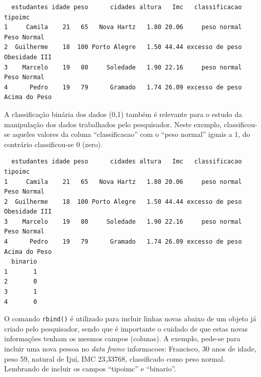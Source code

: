 \documentclass[12pt,brazil,oneside]{book}
\newenvironment{Shaded}{\begin{snugshade}}{\end{snugshade}}
\newcommand{\CommentTok}[1]{\textcolor[rgb]{0.56,0.35,0.01}{\textit{#1}}}
\newcommand{\DecValTok}[1]{\textcolor[rgb]{0.00,0.00,0.81}{#1}}
\newcommand{\KeywordTok}[1]{\textcolor[rgb]{0.13,0.29,0.53}{\textbf{#1}}}
\newcommand{\NormalTok}[1]{#1}
\newcommand{\OperatorTok}[1]{\textcolor[rgb]{0.81,0.36,0.00}{\textbf{#1}}}
\newcommand{\StringTok}[1]{\textcolor[rgb]{0.31,0.60,0.02}{#1}}
\begin{document}
\begin{verbatim}
  estudantes idade peso      cidades altura   Imc   classificacao       tipoimc
1     Camila    21   65   Nova Hartz   1.80 20.06     peso normal   Peso Normal
2  Guilherme    18  100 Porto Alegre   1.50 44.44 excesso de peso Obesidade III
3    Marcelo    19   80     Soledade   1.90 22.16     peso normal   Peso Normal
4      Pedro    19   79      Gramado   1.74 26.09 excesso de peso Acima do Peso
\end{verbatim}

A classificação binária dos dados (0,1) também é relevante para o estudo
da manipulação dos dados trabalhados pelo pesquisador. Neste exemplo,
classificou-se aqueles valores da coluna ``classificacao'' com o ``peso
normal'' iguais a 1, do contrário classificou-se 0 (zero).

\begin{Shaded}
\end{Shaded}

\begin{verbatim}
  estudantes idade peso      cidades altura   Imc   classificacao       tipoimc
1     Camila    21   65   Nova Hartz   1.80 20.06     peso normal   Peso Normal
2  Guilherme    18  100 Porto Alegre   1.50 44.44 excesso de peso Obesidade III
3    Marcelo    19   80     Soledade   1.90 22.16     peso normal   Peso Normal
4      Pedro    19   79      Gramado   1.74 26.09 excesso de peso Acima do Peso
  binario
1       1
2       0
3       1
4       0
\end{verbatim}

O comando \texttt{rbind()} é utilizado para incluir linhas novas abaixo
de um objeto já criado pelo pesquisador, sendo que é importante o
cuidado de que estas novas informações tenham os mesmos campos
(colunas). A exemplo, pede-se para incluir uma nova pessoa no \emph{data
frame} informacoes: Francisco, 30 anos de idade, peso 59, natural de
Ijuí, IMC 23,33768, classificado como peso normal. Lembrando de incluir
os campos ``tipoimc'' e ``binario''.
\end{document}
